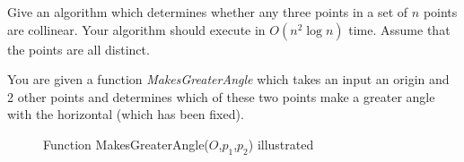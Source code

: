 Give an algorithm which determines whether any three points in a set
of $n$ points are collinear. Your algorithm should execute in
$O(n^2\log  n)$ time. Assume that the points are all distinct.

You are given a function {\em MakesGreaterAngle} which takes an input
an origin and 2 other points and determines which of these two points
make a greater angle with the horizontal (which has been fixed).

\begin{figure}
\centerline{}
\caption{Function MakesGreaterAngle($O$,$p_1$,$p_2$) illustrated}
\end{figure}
